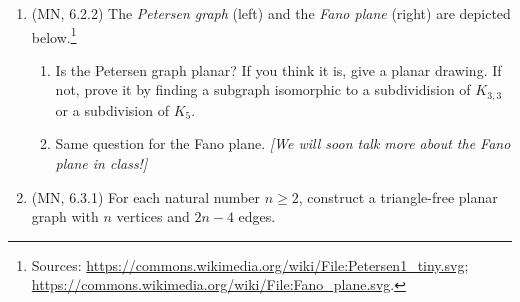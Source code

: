 \documentclass{amsart}
\theoremstyle{definition}
\begin{document}
\begin{enumerate}
\item (MN, 6.2.2) The \emph{Petersen graph} (left) and the \emph{Fano plane} (right) are depicted below.\footnote{Sources: \url{https://commons.wikimedia.org/wiki/File:Petersen1_tiny.svg}; \url{https://commons.wikimedia.org/wiki/File:Fano_plane.svg}.}

  \begin{figure}[ht]
\hfill
{}
\hfill
{}
\hfill

\end{figure}
  
  \begin{enumerate}
  \item Is the Petersen graph planar? If you think it is, give a planar drawing. If not, prove it by finding a subgraph isomorphic to a subdividision of $K_{3, 3}$ or a subdivision of $K_5$.
  \item Same question for the Fano plane. \emph{[We will soon talk more about the Fano plane in class!]}
  \end{enumerate}

\item (MN, 6.3.1) For each natural number $n \ge 2$, construct a triangle-free planar graph with $n$ vertices and $2n - 4$ edges.


\end{enumerate}
\end{document}
